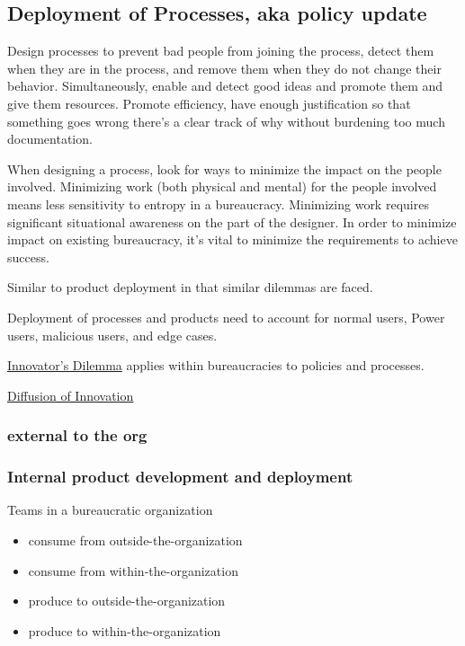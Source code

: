 \subsection{Deployment of Processes, aka policy update}

Design processes to prevent bad people from joining the process, detect them when they are in the process, and remove them when they do not change their behavior. Simultaneously, enable and detect good ideas and promote them and give them resources.
Promote efficiency, have enough justification so that something goes wrong there's a clear track of why without burdening too much documentation.


When designing a process, look for ways to minimize the impact on the people involved. Minimizing work (both physical and mental) for the people involved means less sensitivity to entropy in a bureaucracy. Minimizing work requires significant situational awareness on the part of the designer. In order to minimize impact on existing bureaucracy, it's vital to minimize the requirements to achieve success.


Similar to product deployment in that similar dilemmas are faced.

Deployment of processes and products need to account for 
normal users, Power users, malicious users, and edge cases.

\href{https://en.m.wikipedia.org/wiki/The_Innovator's_Dilemma}{Innovator's Dilemma} applies within bureaucracies to policies and processes.

\href{https://en.wikipedia.org/wiki/Diffusion_of_innovations}{Diffusion of Innovation}

\subsubsection{external to the org}


\subsubsection{Internal product development and deployment\label{sec:internal_product}}

Teams in a bureaucratic organization 
\begin{itemize}
    \item consume from outside-the-organization
    \item consume from within-the-organization
    \item produce to outside-the-organization
    \item produce to within-the-organization
\end{itemize}


